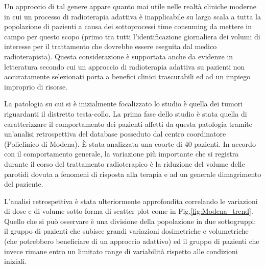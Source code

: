 Un approccio di tal genere appare quanto mai utile nelle realtà cliniche moderne in cui un processo di radioterapia adattiva è inapplicabile su larga scala a tutta la popolazione di pazienti a causa dei sottoprocessi time consuming da mettere in campo per questo scopo (primo tra tutti l'identificazione giornaliera dei volumi di interesse per il trattamento che dovrebbe essere eseguita dal medico radioterapista). Questa considerazione è supportata anche da evidenze in letteratura \cite{Capelle2012} secondo cui un approccio di radioterapia adattiva su pazienti non accuratamente selezionati porta a benefici clinici trascurabili ed ad un impiego improprio di risorse.


La patologia su cui si è inizialmente focalizzato lo studio è quella dei tumori riguardanti il distretto testa-collo. La prima fase dello studio è stata quella di caratterizzare il comportamento dei pazienti affetti da questa patologia tramite un'analisi retrospettiva del database posseduto dal centro coordinatore (Policlinico di Modena). \`E stata analizzata una coorte di 40 pazienti. In accordo con il comportamento generale, la variazione più importante che si registra durante il corso del trattamento radioterapico è la riduzione del volume delle parotidi dovuta a fenomeni di risposta alla terapia e ad un generale dimagrimento del paziente. %

L'analisi retrospettiva è stata ulteriormente approfondita correlando le variazioni di dose e di volume sotto forma di scatter plot come in Fig.\ref{fig:Modena_trend}. Quello che si può osservare è una divisione della popolazione in due sottogruppi: il gruppo di pazienti che subisce grandi variazioni dosimetriche e volumetriche (che potrebbero beneficiare di un approccio adattivo) ed il gruppo di pazienti che invece rimane entro un limitato range di variabilità rispetto alle condizioni iniziali.

